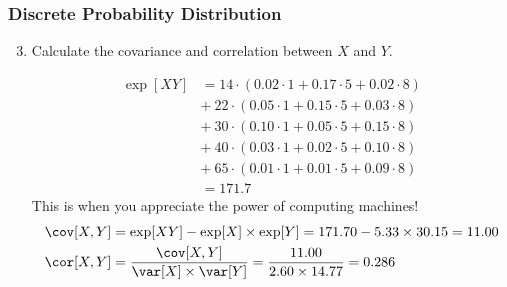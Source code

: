 \begin{frame}
\frametitle{Discrete Probability Distribution}
\begin{enumerate}\setcounter{enumi}{2}

\item Calculate the covariance and correlation between $X$ and $Y$. 
%
\begin{answer}
\begin{align*}
\exp[XY] 
  & =  14 \cdot \left(0.02 \cdot 1 + 0.17 \cdot 5 + 0.02 \cdot 8\right)\\
  & +\ 22 \cdot \left(0.05 \cdot 1 + 0.15 \cdot 5 + 0.03 \cdot 8\right)\\
  & +\ 30 \cdot \left(0.10 \cdot 1 + 0.05 \cdot 5 + 0.15 \cdot 8\right)\\
  & +\ 40 \cdot \left(0.03 \cdot 1 + 0.02 \cdot 5 + 0.10 \cdot 8\right)\\
  & +\ 65 \cdot \left(0.01 \cdot 1 + 0.01 \cdot 5 + 0.09 \cdot 8\right)\\[1ex]
  & = 171.7 
\end{align*}
This is when you appreciate the power of computing machines!
\pause
\begin{align*}
\cov[X,Y]
  & = \exp[XY] - \exp[X] \times \exp[Y] 
    = 171.70 - 5.33 \times 30.15
    = 11.00\\
\cor[X,Y]
  & = \frac{\cov[X,Y]}{\var[X]\times\var[Y]} 
    = \frac{11.00}{2.60 \times 14.77}
    = 0.286
\end{align*}
\end{answer}

\end{enumerate}
\end{frame}


